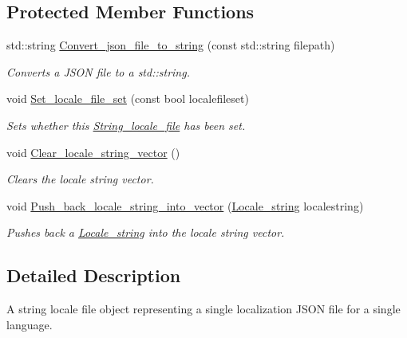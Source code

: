 \subsection*{Protected Member Functions}
\begin{DoxyCompactItemize}
\item 
std\+::string \hyperlink{classjetfuel_1_1locale_1_1String__locale__file_af2719ec2b341bf7d7b052f509a996b91}{Convert\+\_\+json\+\_\+file\+\_\+to\+\_\+string} (const std\+::string filepath)
\begin{DoxyCompactList}\small\item\em Converts a J\+S\+ON file to a std\+::string. \end{DoxyCompactList}\item 
void \hyperlink{classjetfuel_1_1locale_1_1String__locale__file_a5ca20a4480bcd4b328d58c46fc2fae46}{Set\+\_\+locale\+\_\+file\+\_\+set} (const bool localefileset)
\begin{DoxyCompactList}\small\item\em Sets whether this \hyperlink{classjetfuel_1_1locale_1_1String__locale__file}{String\+\_\+locale\+\_\+file} has been set. \end{DoxyCompactList}\item 
void \hyperlink{classjetfuel_1_1locale_1_1String__locale__file_a5948bd943df61fee3426f385a1e3b24e}{Clear\+\_\+locale\+\_\+string\+\_\+vector} ()
\begin{DoxyCompactList}\small\item\em Clears the locale string vector. \end{DoxyCompactList}\item 
void \hyperlink{classjetfuel_1_1locale_1_1String__locale__file_ab784fd48c26d8e7658c20a18b07a599e}{Push\+\_\+back\+\_\+locale\+\_\+string\+\_\+into\+\_\+vector} (\hyperlink{structjetfuel_1_1locale_1_1Locale__string}{Locale\+\_\+string} localestring)
\begin{DoxyCompactList}\small\item\em Pushes back a \hyperlink{structjetfuel_1_1locale_1_1Locale__string}{Locale\+\_\+string} into the locale string vector. \end{DoxyCompactList}\end{DoxyCompactItemize}


\subsection{Detailed Description}
A string locale file object representing a single localization J\+S\+ON file for a single language.


